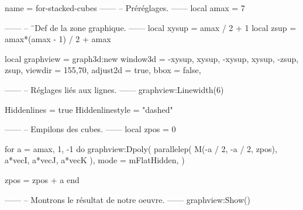 \documentclass[border = 3pt]{standalone}
\begin{document}
\begin{luadraw}{name = for-stacked-cubes}
------
-- Préréglages.
------
local amax = 7

------
-- ¨Def de la zone graphique.
------
local xysup = amax / 2 + 1
local zsup  = amax*(amax - 1) / 2 + amax

local graphview = graph3d:new{
  window3d = {-xysup, xysup, -xysup, xysup, -zsup, zsup},
  viewdir  = {155,70},
  adjust2d = true,
  bbox     = false,
}

------
-- Réglages liés aux lignes.
------
graphview:Linewidth(6)

Hiddenlines     = true
Hiddenlinestyle = "dashed"

------
-- Empilons des cubes.
------
local zpos  = 0

for a = amax, 1, -1 do
  graphview:Dpoly(
    parallelep(
      M(-a / 2, -a / 2, zpos),
      a*vecI, a*vecJ, a*vecK
    ),
    {
      mode = mFlatHidden,
    }
  )

  zpos = zpos + a
end

------
-- Montrons le résultat de notre oeuvre.
------
graphview:Show()
\end{luadraw}
\end{document}
